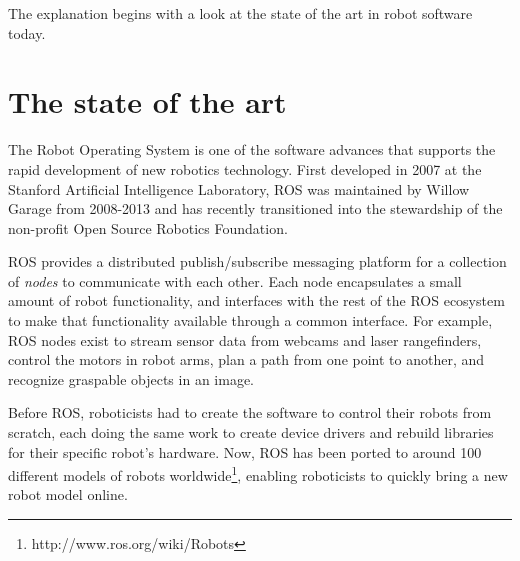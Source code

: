 \documentclass[10pt,twocolumn]{article}
\begin{document}
The explanation begins with a look at the state of the art in robot software today.


\section{The state of the art}


The Robot Operating System\cite{ros} is one of the software advances that supports the rapid development of new robotics technology.  First developed in 2007 at the Stanford Artificial Intelligence Laboratory, ROS was maintained by Willow Garage from 2008-2013 and has recently transitioned into the stewardship of the non-profit Open Source Robotics Foundation.

ROS provides a distributed publish/subscribe messaging platform for a collection of {\em nodes} to communicate with each other. Each node encapsulates a small amount of robot functionality, and interfaces with the rest of the ROS ecosystem to make that functionality available through a common interface. For example, ROS nodes exist to stream sensor data from webcams and laser rangefinders, control the motors in robot arms, plan a path from one point to another, and recognize graspable objects in an image.

Before ROS, roboticists had to create the software to control their robots from scratch, each doing the same work to create device drivers and rebuild libraries for their specific robot's hardware.  Now, ROS has been ported to around 100 different models of robots worldwide\footnote{http://www.ros.org/wiki/Robots}, enabling roboticists to quickly bring a new robot model online.
\end{document}
